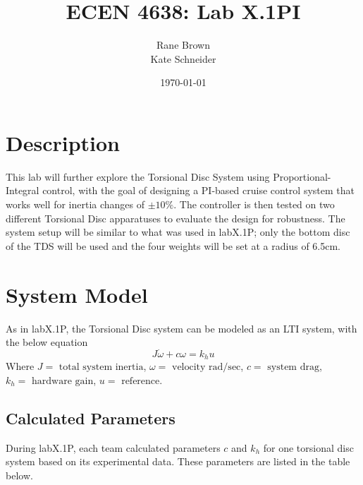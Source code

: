 \documentclass[11pt,titlepage]{article}
\author{Rane Brown \\ Kate Schneider}
\title{ECEN 4638: Lab X.1PI}
\date{\today}
\begin{document}
\maketitle
\tableofcontents
\listoffigures
\newpage

\section{Description}
    This lab will further explore the Torsional Disc System using Proportional-Integral control, with the goal of designing a PI-based cruise control system that works well for inertia changes of $\pm10\%$. The controller is then tested on two different Torsional Disc apparatuses to evaluate the design for robustness. The system setup will be similar to what was used in labX.1P; only the bottom disc of the TDS will be used and the four weights will be set at a radius of 6.5cm.


\section{System Model}
   As in labX.1P, the Torsional Disc system can be modeled as an LTI system, with the below equation
    \begin{equation} \label{eq:lti}
        J\dot{\omega}+c\omega=k_hu
    \end{equation}
    Where $J=\mbox{ total system inertia}$, $\omega=\mbox{ velocity rad/sec}$, $c=\mbox{ system drag}$, $k_h=\mbox{ hardware gain}$, $u=\mbox{ reference}$.
    
    
    \subsection{Calculated Parameters}
        During labX.1P, each team calculated parameters $c$ and $k_h$ for one torsional disc system based on its experimental data. These parameters are listed in the table below.
\end{document}

